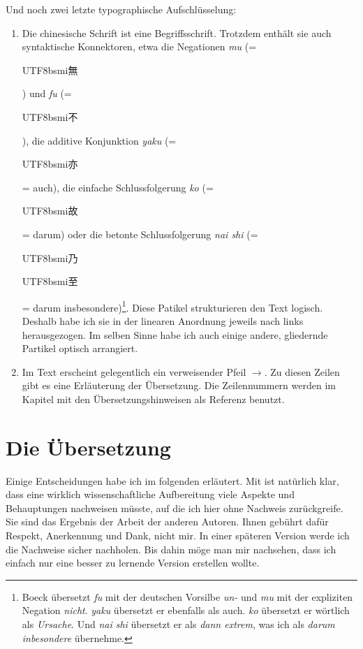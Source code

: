 \documentclass[
DIV=calc,
BCOR=5mm,
11pt,
headings=small,
oneside,
bibtotocnumbered,
english,ngerman]{scrartcl}
\newcommand{\cnbsmi}[1]{\begin{CJK}{UTF8}{bsmi}#1\end{CJK}}
\begin{document}
Und noch zwei letzte typographische Aufschlüsselung: 

\begin{enumerate}
  \item Die chinesische Schrift ist eine Begriffsschrift. Trotzdem enthält sie
  auch syntaktische Konnektoren, etwa die Negationen \emph{mu} (= \cnbsmi{無})
  und  \emph{fu} (= \cnbsmi{不}), die additive Konjunktion \emph{yaku} (=
  \cnbsmi{亦} = auch), die einfache Schlussfolgerung \emph{ko} (= \cnbsmi{故} =
  darum) oder die betonte Schlussfolgerung \emph{nai shi} (= \cnbsmi{乃}
  \cnbsmi{至} = darum insbesondere)\footnote{Boeck übersetzt \emph{fu} mit der
  deutschen Vorsilbe \emph{un-} und \emph{mu} mit der expliziten Negation
  \emph{nicht}. \emph{yaku} übersetzt er ebenfalls als auch. \emph{ko} übersetzt
  er wörtlich als \emph{Ursache}. Und \emph{nai shi} übersetzt er als \emph{dann
  extrem}, was ich als \emph{darum inbesondere}
  übernehme.\cite[vgl][\nopage]{Boeck2016a}}. Diese Patikel strukturieren den
  Text logisch. Deshalb habe ich sie in der linearen Anordnung jeweils nach
  links herausgezogen. Im selben Sinne habe ich auch einige andere, gliedernde
  Partikel optisch arrangiert.
  \item Im Text erscheint gelegentlich ein verweisender Pfeil
  \emph{$\rightarrow$}. Zu diesen Zeilen gibt es eine Erläuterung der
  Übersetzung. Die Zeilennummern werden im Kapitel mit den Übersetzungshinweisen
  als Referenz benutzt.
\end{enumerate}

\section{Die Übersetzung} 

Einige Entscheidungen habe ich im folgenden erläutert. Mit ist natürlich klar,
dass eine wirklich wissenschaftliche Aufbereitung viele Aspekte und Behauptungen
nachweisen müsste, auf die ich hier ohne Nachweis zurückgreife. Sie sind das
Ergebnis der Arbeit der anderen Autoren. Ihnen gebührt dafür Respekt,
Anerkennung und Dank, nicht mir. In einer späteren Version werde ich die
Nachweise sicher nachholen. Bis dahin möge man mir nachsehen, dass ich einfach
nur eine besser zu lernende Version erstellen wollte.
\end{document}

